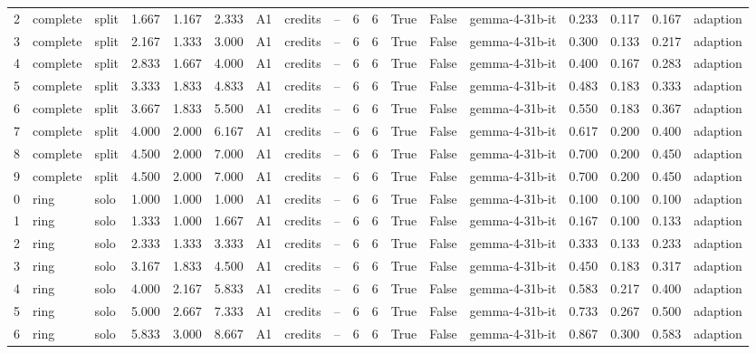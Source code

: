 \begin{table}
\begin{tabular}{rllrrrllrrrrrlrrrl}
2 & complete & split & 1.667 & 1.167 & 2.333 & A1 & credits & -- & 6 & 6 & True & False & gemma-4-31b-it & 0.233 & 0.117 & 0.167 & adaption \\
3 & complete & split & 2.167 & 1.333 & 3.000 & A1 & credits & -- & 6 & 6 & True & False & gemma-4-31b-it & 0.300 & 0.133 & 0.217 & adaption \\
4 & complete & split & 2.833 & 1.667 & 4.000 & A1 & credits & -- & 6 & 6 & True & False & gemma-4-31b-it & 0.400 & 0.167 & 0.283 & adaption \\
5 & complete & split & 3.333 & 1.833 & 4.833 & A1 & credits & -- & 6 & 6 & True & False & gemma-4-31b-it & 0.483 & 0.183 & 0.333 & adaption \\
6 & complete & split & 3.667 & 1.833 & 5.500 & A1 & credits & -- & 6 & 6 & True & False & gemma-4-31b-it & 0.550 & 0.183 & 0.367 & adaption \\
7 & complete & split & 4.000 & 2.000 & 6.167 & A1 & credits & -- & 6 & 6 & True & False & gemma-4-31b-it & 0.617 & 0.200 & 0.400 & adaption \\
8 & complete & split & 4.500 & 2.000 & 7.000 & A1 & credits & -- & 6 & 6 & True & False & gemma-4-31b-it & 0.700 & 0.200 & 0.450 & adaption \\
9 & complete & split & 4.500 & 2.000 & 7.000 & A1 & credits & -- & 6 & 6 & True & False & gemma-4-31b-it & 0.700 & 0.200 & 0.450 & adaption \\
0 & ring & solo & 1.000 & 1.000 & 1.000 & A1 & credits & -- & 6 & 6 & True & False & gemma-4-31b-it & 0.100 & 0.100 & 0.100 & adaption \\
1 & ring & solo & 1.333 & 1.000 & 1.667 & A1 & credits & -- & 6 & 6 & True & False & gemma-4-31b-it & 0.167 & 0.100 & 0.133 & adaption \\
2 & ring & solo & 2.333 & 1.333 & 3.333 & A1 & credits & -- & 6 & 6 & True & False & gemma-4-31b-it & 0.333 & 0.133 & 0.233 & adaption \\
3 & ring & solo & 3.167 & 1.833 & 4.500 & A1 & credits & -- & 6 & 6 & True & False & gemma-4-31b-it & 0.450 & 0.183 & 0.317 & adaption \\
4 & ring & solo & 4.000 & 2.167 & 5.833 & A1 & credits & -- & 6 & 6 & True & False & gemma-4-31b-it & 0.583 & 0.217 & 0.400 & adaption \\
5 & ring & solo & 5.000 & 2.667 & 7.333 & A1 & credits & -- & 6 & 6 & True & False & gemma-4-31b-it & 0.733 & 0.267 & 0.500 & adaption \\
6 & ring & solo & 5.833 & 3.000 & 8.667 & A1 & credits & -- & 6 & 6 & True & False & gemma-4-31b-it & 0.867 & 0.300 & 0.583 & adaption \\

\end{tabular}
\end{table}
